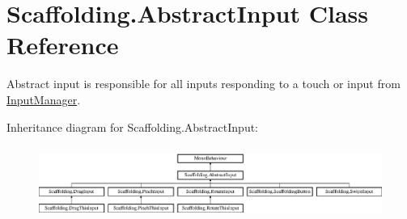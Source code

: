 \hypertarget{class_scaffolding_1_1_abstract_input}{\section{Scaffolding.\-Abstract\-Input Class Reference}
\label{class_scaffolding_1_1_abstract_input}
}


Abstract input is responsible for all inputs responding to a touch or input from \hyperlink{class_scaffolding_1_1_input_manager}{Input\-Manager}.  


Inheritance diagram for Scaffolding.\-Abstract\-Input\-:\begin{figure}[H]
\begin{center}
\leavevmode
\includegraphics[height=2.395722cm]{class_scaffolding_1_1_abstract_input}
\end{center}
\end{figure}
